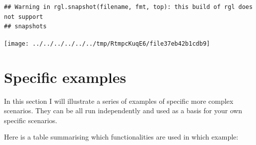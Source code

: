 \documentclass[
]{book}
\begin{document}
\begin{verbatim}
## Warning in rgl.snapshot(filename, fmt, top): this build of rgl does not support
## snapshots
\end{verbatim}

\texttt{[image: ../../../../../../tmp/RtmpcKuqE6/file37eb42b1cdb9]}

\hypertarget{specific-examples}{%
\chapter{Specific examples}\label{specific-examples}}

In this section I will illustrate a series of examples of specific more complex scenarios.
They can be all run independently and used as a basis for your own specific scenarios.

Here is a table summarising which functionalities are used in which example:
\end{document}
